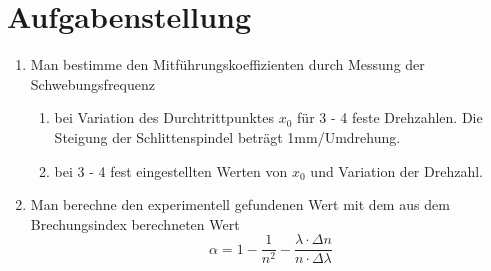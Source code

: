 \section{Aufgabenstellung}

\begin{enumerate}

\item Man bestimme den Mitführungskoeffizienten durch Messung der Schwebungsfrequenz
	\begin{enumerate}
	\item bei Variation des Durchtrittpunktes $x_0$ für 3 - 4 feste Drehzahlen. Die Steigung der Schlittenspindel 		beträgt 1mm/Umdrehung.
	\item bei 3 - 4 fest eingestellten Werten von $x_0$ und Variation der Drehzahl.
	\end{enumerate}
\item Man berechne den experimentell gefundenen Wert mit dem aus dem Brechungsindex berechneten Wert
	\begin{equation} \alpha = 1 - \frac{1}{n^2} - \frac{\lambda\cdot\Delta n}{n\cdot\Delta\lambda} \end{equation}
	
\end{enumerate}